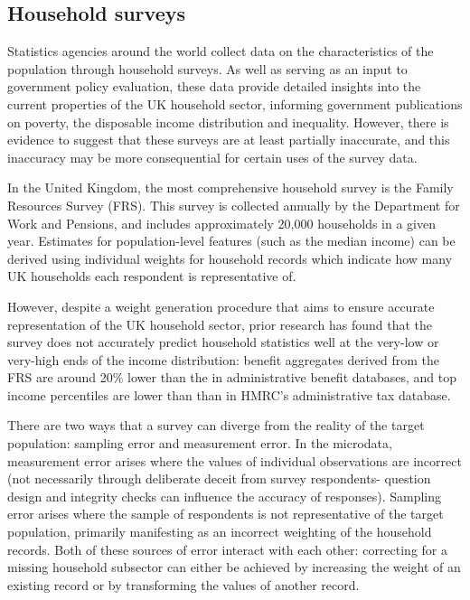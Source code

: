 \documentclass[10pt,journal,compsoc]{IEEEtran}
\begin{document}
\subsection{Household surveys}

Statistics agencies around the world collect data on the characteristics of the population through household surveys. As well as serving as an input to government policy evaluation, these data provide detailed insights into the current properties of the UK household sector, informing government publications on poverty, the disposable income distribution and inequality. However, there is evidence to suggest that these surveys are at least partially inaccurate, and this inaccuracy may be more consequential for certain uses of the survey data.

In the United Kingdom, the most comprehensive household survey is the Family Resources Survey (FRS). This survey is collected annually by the Department for Work and Pensions, and includes approximately 20,000 households in a given year. Estimates for population-level features (such as the median income) can be derived using individual weights for household records which indicate how many UK households each respondent is representative of. 

However, despite a weight generation procedure that aims to ensure accurate representation of the UK household sector, prior research has found that the survey does not accurately predict household statistics well at the very-low or very-high ends of the income distribution: benefit aggregates derived from the FRS are around 20\% lower than the in administrative benefit databases, and top income percentiles are lower than than in HMRC's administrative tax database.

There are two ways that a survey can diverge from the reality of the target population: sampling error and measurement error. In the microdata, measurement error arises where the values of individual observations are incorrect (not necessarily through deliberate deceit from survey respondents- question design and integrity checks can influence the accuracy of responses). Sampling error arises where the sample of respondents is not representative of the target population, primarily manifesting as an incorrect weighting of the household records. Both of these sources of error interact with each other: correcting for a missing household subsector can either be achieved by increasing the weight of an existing record or by transforming the values of another record.
\end{document}
